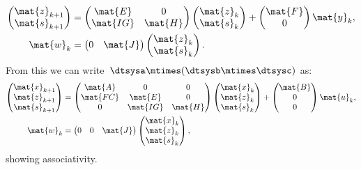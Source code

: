\begin{equation*}
	\label{eq:dlin-6}
	\begin{aligned}
		\begin{pmatrix}
			\mat{z}_{k+1} \\
			\mat{s}_{k+1}
		\end{pmatrix} & =
		\begin{pmatrix}
			\mat{E}  & 0       \\
			\mat{IG} & \mat{H}
		\end{pmatrix}\begin{pmatrix}
			\mat{z}_k \\ \mat{s}_k
		\end{pmatrix}+
		\begin{pmatrix}
			\mat{F} \\ 0
		\end{pmatrix}\mat{y}_k,                                                \\
		\mat{w}_k                  & =\begin{pmatrix}
			0 & \mat{J}
		\end{pmatrix}\begin{pmatrix}
			\mat{z}_k \\ \mat{s}_k
		\end{pmatrix}.
	\end{aligned}
\end{equation*}
From this we can write~$\dtsysa\mtimes (\dtsysb\mtimes \dtsysc)$ as:
\begin{equation*}
	\label{eq:dlin-7}
	\begin{aligned}
		\begin{pmatrix}
			\mat{x}_{k+1} \\
			\mat{z}_{k+1} \\
			\mat{s}_{k+1}
		\end{pmatrix} & =
		\begin{pmatrix}
			\mat{A}  & 0        & 0       \\
			\mat{FC} & \mat{E}  & 0       \\
			0        & \mat{IG} & \mat{H}
		\end{pmatrix}\begin{pmatrix}
			\mat{x}_k \\ \mat{z}_k\\ \mat{s}_k
		\end{pmatrix}+
		\begin{pmatrix}
			\mat{B} \\ 0\\ 0
		\end{pmatrix}\mat{u}_k,                                                \\
		\mat{w}_k                  & =\begin{pmatrix}
			0 & 0 & \mat{J}
		\end{pmatrix}\begin{pmatrix}
			\mat{x}_k \\ \mat{z}_k\\ \mat{s}_k
		\end{pmatrix},
	\end{aligned}
\end{equation*}
showing associativity.

